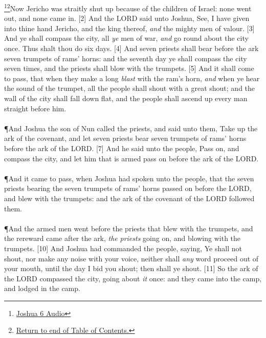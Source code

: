 \footnote{\href{https://audiobible.com/bible/joshua_6.html}{\textcolor[cmyk]{0.99998,1,0,0}{Joshua 6 Audio}}}\footnote{\textcolor[cmyk]{0.99998,1,0,0}{\hyperlink{TOC}{Return to end of Table of Contents.}}}\textcolor[cmyk]{0.99998,1,0,0}{Now Jericho was straitly shut up because of the children of Israel: none went out, and none came in.}
[2] \textcolor[cmyk]{0.99998,1,0,0}{And the LORD said unto Joshua, See, I have given into thine hand Jericho, and the king thereof, \emph{and} the mighty men of valour.}
[3] \textcolor[cmyk]{0.99998,1,0,0}{And ye shall compass the city, all \emph{ye} men of war, \emph{and} go round about the city once. Thus shalt thou do six days.}
[4] \textcolor[cmyk]{0.99998,1,0,0}{And seven priests shall bear before the ark seven trumpets of rams' horns: and the seventh day ye shall compass the city seven times, and the priests shall blow with the trumpets.}
[5] \textcolor[cmyk]{0.99998,1,0,0}{And it shall come to pass, that when they make a long \emph{blast} with the ram's horn, \emph{and} when ye hear the sound of the trumpet, all the people shall shout with a great shout; and the wall of the city shall fall down flat, and the people shall ascend up every man straight before him.}\\
\\
\P \textcolor[cmyk]{0.99998,1,0,0}{And Joshua the son of Nun called the priests, and said unto them, Take up the ark of the covenant, and let seven priests bear seven trumpets of rams' horns before the ark of the LORD.}
[7] \textcolor[cmyk]{0.99998,1,0,0}{And he said unto the people, Pass on, and compass the city, and let him that is armed pass on before the ark of the LORD.}\\
\\
\P \textcolor[cmyk]{0.99998,1,0,0}{And it came to pass, when Joshua had spoken unto the people, that the seven priests bearing the seven trumpets of rams' horns passed on before the LORD, and blew with the trumpets: and the ark of the covenant of the LORD followed them.}\\
\\
\P  \textcolor[cmyk]{0.99998,1,0,0}{And the armed men went before the priests that blew with the trumpets, and the rereward came after the ark, \emph{the} \emph{priests} going on, and blowing with the trumpets.}
[10] \textcolor[cmyk]{0.99998,1,0,0}{And Joshua had commanded the people, saying, Ye shall not shout, nor make any noise with your voice, neither shall \emph{any} word proceed out of your mouth, until the day I bid you shout; then shall ye shout.} 
[11] \textcolor[cmyk]{0.99998,1,0,0}{So the ark of the LORD compassed the city, going about \emph{it} once: and they came into the camp, and lodged in the camp.}\\
